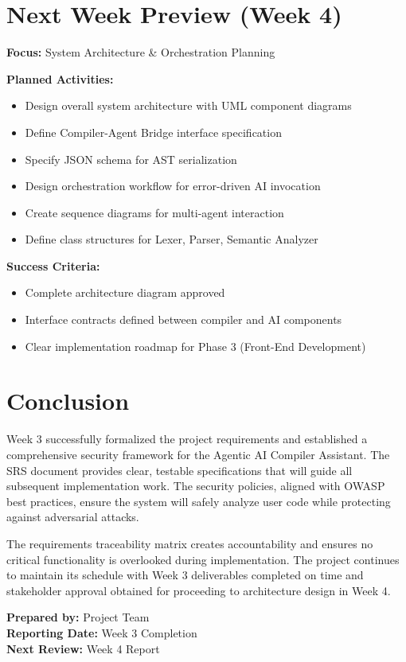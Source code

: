 \documentclass[a4paper,11pt]{article}
\begin{document}
\section{Next Week Preview (Week 4)}

\textbf{Focus:} System Architecture \& Orchestration Planning

\textbf{Planned Activities:}
\begin{itemize}[leftmargin=*]
    \item Design overall system architecture with UML component diagrams
    \item Define Compiler-Agent Bridge interface specification
    \item Specify JSON schema for AST serialization
    \item Design orchestration workflow for error-driven AI invocation
    \item Create sequence diagrams for multi-agent interaction
    \item Define class structures for Lexer, Parser, Semantic Analyzer
\end{itemize}

\textbf{Success Criteria:}
\begin{itemize}[leftmargin=*]
    \item Complete architecture diagram approved
    \item Interface contracts defined between compiler and AI components
    \item Clear implementation roadmap for Phase 3 (Front-End Development)
\end{itemize}

\section{Conclusion}

Week 3 successfully formalized the project requirements and established a comprehensive security framework for the Agentic AI Compiler Assistant. The SRS document provides clear, testable specifications that will guide all subsequent implementation work. The security policies, aligned with OWASP best practices, ensure the system will safely analyze user code while protecting against adversarial attacks.

The requirements traceability matrix creates accountability and ensures no critical functionality is overlooked during implementation. The project continues to maintain its schedule with Week 3 deliverables completed on time and stakeholder approval obtained for proceeding to architecture design in Week 4.

\vspace{5mm}
\noindent\textbf{Prepared by:} Project Team \\
\textbf{Reporting Date:} Week 3 Completion \\
\textbf{Next Review:} Week 4 Report
\end{document}
